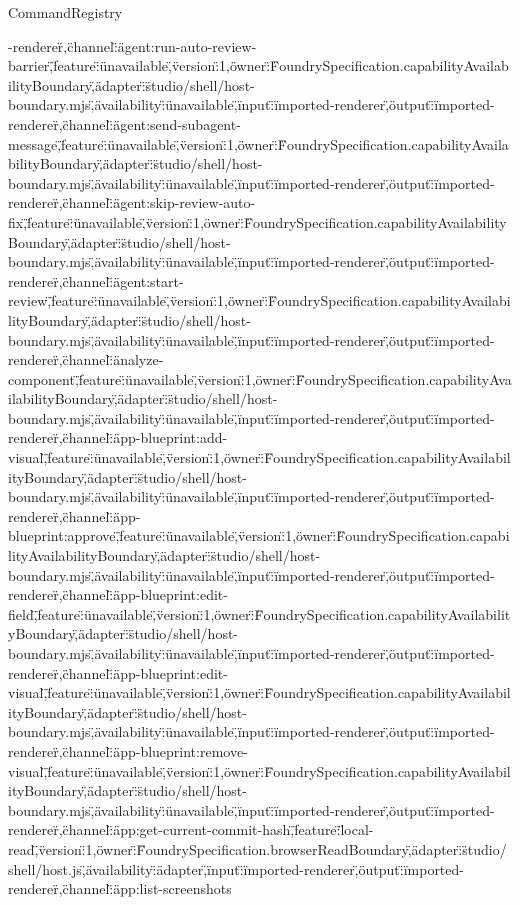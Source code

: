 \begin{lexlean}{CommandRegistry}
\begin{semanticmodule}
{-renderer\"},{\"channel\":\"agent:run-auto-review-barrier\",\"feature\":\"unavailable\",\"version\":1,\"owner\":\"FoundrySpecification.capabilityAvailabilityBoundary\",\"adapter\":\"studio/shell/host-boundary.mjs\",\"availability\":\"unavailable\",\"input\":\"imported-renderer\",\"output\":\"imported-renderer\"},{\"channel\":\"agent:send-subagent-message\",\"feature\":\"unavailable\",\"version\":1,\"owner\":\"FoundrySpecification.capabilityAvailabilityBoundary\",\"adapter\":\"studio/shell/host-boundary.mjs\",\"availability\":\"unavailable\",\"input\":\"imported-renderer\",\"output\":\"imported-renderer\"},{\"channel\":\"agent:skip-review-auto-fix\",\"feature\":\"unavailable\",\"version\":1,\"owner\":\"FoundrySpecification.capabilityAvailabilityBoundary\",\"adapter\":\"studio/shell/host-boundary.mjs\",\"availability\":\"unavailable\",\"input\":\"imported-renderer\",\"output\":\"imported-renderer\"},{\"channel\":\"agent:start-review\",\"feature\":\"unavailable\",\"version\":1,\"owner\":\"FoundrySpecification.capabilityAvailabilityBoundary\",\"adapter\":\"studio/shell/host-boundary.mjs\",\"availability\":\"unavailable\",\"input\":\"imported-renderer\",\"output\":\"imported-renderer\"},{\"channel\":\"analyze-component\",\"feature\":\"unavailable\",\"version\":1,\"owner\":\"FoundrySpecification.capabilityAvailabilityBoundary\",\"adapter\":\"studio/shell/host-boundary.mjs\",\"availability\":\"unavailable\",\"input\":\"imported-renderer\",\"output\":\"imported-renderer\"},{\"channel\":\"app-blueprint:add-visual\",\"feature\":\"unavailable\",\"version\":1,\"owner\":\"FoundrySpecification.capabilityAvailabilityBoundary\",\"adapter\":\"studio/shell/host-boundary.mjs\",\"availability\":\"unavailable\",\"input\":\"imported-renderer\",\"output\":\"imported-renderer\"},{\"channel\":\"app-blueprint:approve\",\"feature\":\"unavailable\",\"version\":1,\"owner\":\"FoundrySpecification.capabilityAvailabilityBoundary\",\"adapter\":\"studio/shell/host-boundary.mjs\",\"availability\":\"unavailable\",\"input\":\"imported-renderer\",\"output\":\"imported-renderer\"},{\"channel\":\"app-blueprint:edit-field\",\"feature\":\"unavailable\",\"version\":1,\"owner\":\"FoundrySpecification.capabilityAvailabilityBoundary\",\"adapter\":\"studio/shell/host-boundary.mjs\",\"availability\":\"unavailable\",\"input\":\"imported-renderer\",\"output\":\"imported-renderer\"},{\"channel\":\"app-blueprint:edit-visual\",\"feature\":\"unavailable\",\"version\":1,\"owner\":\"FoundrySpecification.capabilityAvailabilityBoundary\",\"adapter\":\"studio/shell/host-boundary.mjs\",\"availability\":\"unavailable\",\"input\":\"imported-renderer\",\"output\":\"imported-renderer\"},{\"channel\":\"app-blueprint:remove-visual\",\"feature\":\"unavailable\",\"version\":1,\"owner\":\"FoundrySpecification.capabilityAvailabilityBoundary\",\"adapter\":\"studio/shell/host-boundary.mjs\",\"availability\":\"unavailable\",\"input\":\"imported-renderer\",\"output\":\"imported-renderer\"},{\"channel\":\"app:get-current-commit-hash\",\"feature\":\"local-read\",\"version\":1,\"owner\":\"FoundrySpecification.browserReadBoundary\",\"adapter\":\"studio/shell/host.js\",\"availability\":\"adapter\",\"input\":\"imported-renderer\",\"output\":\"imported-renderer\"},{\"channel\":\"app:list-screenshots}
\end{semanticmodule}
\end{lexlean}
